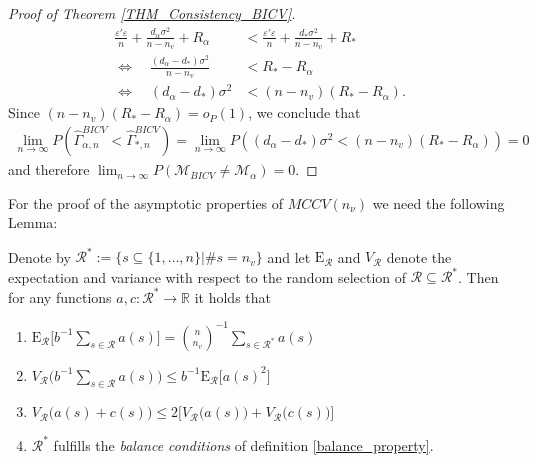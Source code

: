 \documentclass[Research_Module_ES.tex]{subfiles}
\begin{document}
\begin{proof}[Proof of Theorem \ref{THM_Consistency_BICV}]
\begin{align*}
	\frac{\varepsilon'\varepsilon}{n}+\frac{d_\alpha\sigma^2}{n-n_v} +R_\alpha
	&< \frac{\varepsilon'\varepsilon}{n}+\frac{d_\ast\sigma^2}{n-n_v} +R_\ast\\
	\iff \quad \frac{(d_\alpha-d_\ast)\sigma^2}{n-n_v} &< R_\ast -R_\alpha\\
	\iff \quad(d_\alpha-d_\ast)\sigma^2 &< (n-n_v)(R_\ast -R_\alpha).
	\end{align*}
	Since $(n-n_v)(R_\ast -R_\alpha)=o_P(1)$, we conclude that 
	\begin{align*}
	\lim_{n\to\infty} P\left(\hat{\Gamma}_{\alpha,n}^{BICV} < \hat{\Gamma}_{\ast,n}^{BICV}\right) 
	=\lim_{n\to\infty}P\left((d_\alpha-d_\ast)\sigma^2 < (n-n_v)(R_\ast -R_\alpha)\right) = 0 
	\end{align*}
	and therefore $\lim_{n\to\infty}P(\mathcal{M}_{BICV}\neq \mathcal{M}_\alpha) = 0$.
\end{proof}

For the proof of the asymptotic properties of $MCCV(n_\nu)$ we need the following Lemma:  

\begin{lemma}
	\label{Lemma_MCCV}
	Denote by $\mathcal{R}^\ast:= \{s\subseteq\{1,\dots,n\}|\# s=n_v\}$ and let $\mathrm{E}_\mathcal{R}$ and $V_\mathcal{R}$ denote the expectation and variance with respect to the random selection of $\mathcal{R}\subseteq\mathcal{R}^\ast$. Then for any functions $a,c:\mathcal{R}^\ast\to \mathbb{R}$ it holds that
	\begin{enumerate}
		\item $\mathrm{E}_\mathcal{R} \bigl[ b^{-1}\sum_{s\in \mathcal{R}}a(s)\bigr] = \binom{n}{n_v}^{-1}\sum_{s\in\mathcal{R}^\ast}a(s)$
		\item $V_\mathcal{R} \bigl( b^{-1}\sum_{s\in \mathcal{R}}a(s)\bigr) \le b^{-1} \mathrm{E}_\mathcal{R} \bigl[a(s)^2\bigr]$
		\item $V_\mathcal{R}\bigl(a(s)+c(s)\bigr) \le 2\bigl[V_\mathcal{R}\bigl(a(s)\bigr)+V_\mathcal{R}\bigl(c(s)\bigr)\bigr]$
		\item $\mathcal{R}^\ast$ fulfills the \textit{balance conditions} of definition \ref{balance_property}.
	\end{enumerate}
\end{lemma}
\end{document}
